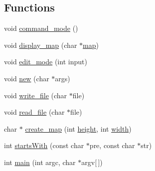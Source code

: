 \subsection*{Functions}
\begin{DoxyCompactItemize}
\item 
void \hyperlink{pacman-level-editor_8c_af892ff919e1c7850c0bd85827b9b648e}{command\-\_\-mode} ()
\item 
void \hyperlink{pacman-level-editor_8c_a77a5d2c2bbebb2204a994de0fc9e066d}{display\-\_\-map} (char $\ast$\hyperlink{pacman-level-editor_8c_a7b00b1bfd666e26484471bd17a74eaa9}{map})
\item 
void \hyperlink{pacman-level-editor_8c_aac01ba2c86cce30701b994bbfbd7e34a}{edit\-\_\-mode} (int input)
\item 
void \hyperlink{pacman-level-editor_8c_a85a88061d1f653b7e99634d24995a1f1}{new} (char $\ast$args)
\item 
void \hyperlink{pacman-level-editor_8c_aaa90b13ddc12479556f96bdaf7cc04a5}{write\-\_\-file} (char $\ast$file)
\item 
void \hyperlink{pacman-level-editor_8c_ae8f3b08f62235bb7c36c368900757640}{read\-\_\-file} (char $\ast$file)
\item 
char $\ast$ \hyperlink{pacman-level-editor_8c_a8a62b1ef65d0697d60b3b762c9cf0799}{create\-\_\-map} (int \hyperlink{pacman-level-editor_8c_ad12fc34ce789bce6c8a05d8a17138534}{height}, int \hyperlink{pacman-level-editor_8c_a2474a5474cbff19523a51eb1de01cda4}{width})
\item 
int \hyperlink{pacman-level-editor_8c_afe756d85f40bd74c8ea6c8722ce012fb}{starts\-With} (const char $\ast$pre, const char $\ast$str)
\item 
int \hyperlink{pacman-level-editor_8c_a0ddf1224851353fc92bfbff6f499fa97}{main} (int argc, char $\ast$argv\mbox{[}$\,$\mbox{]})
\end{DoxyCompactItemize}
